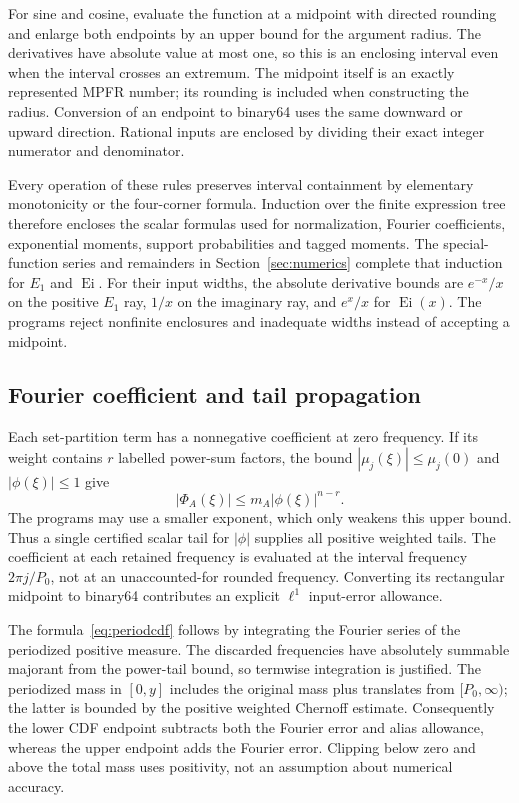 \documentclass[11pt,a4paper]{article}
\theoremstyle{definition}\newtheorem{definition}[theorem]{Definition}
\theoremstyle{remark}\newtheorem{remark}[theorem]{Remark}
\numberwithin{equation}{section}
\begin{document}
For sine and cosine, evaluate the function at a midpoint with directed rounding and enlarge both endpoints by an upper bound for the argument radius. The derivatives have absolute value at most one, so this is an enclosing interval even when the interval crosses an extremum. The midpoint itself is an exactly represented MPFR number; its rounding is included when constructing the radius. Conversion of an endpoint to binary64 uses the same downward or upward direction. Rational inputs are enclosed by dividing their exact integer numerator and denominator.

Every operation of these rules preserves interval containment by elementary monotonicity or the four-corner formula. Induction over the finite expression tree therefore encloses the scalar formulas used for normalization, Fourier coefficients, exponential moments, support probabilities and tagged moments. The special-function series and remainders in Section~\ref{sec:numerics} complete that induction for $E_1$ and $\operatorname{Ei}$. For their input widths, the absolute derivative bounds are $e^{-x}/x$ on the positive $E_1$ ray, $1/x$ on the imaginary ray, and $e^x/x$ for $\operatorname{Ei}(x)$. The programs reject nonfinite enclosures and inadequate widths instead of accepting a midpoint.

\subsection{Fourier coefficient and tail propagation}
Each set-partition term has a nonnegative coefficient at zero frequency. If its weight contains $r$ labelled power-sum factors, the bound $|\mu_j(\xi)|\le\mu_j(0)$ and $|\phi(\xi)|\le1$ give
\[
 |\Phi_A(\xi)|\le m_A|\phi(\xi)|^{n-r}.
\]
The programs may use a smaller exponent, which only weakens this upper bound. Thus a single certified scalar tail for $|\phi|$ supplies all positive weighted tails. The coefficient at each retained frequency is evaluated at the interval frequency $2\pi j/P_0$, not at an unaccounted-for rounded frequency. Converting its rectangular midpoint to binary64 contributes an explicit $\ell^1$ input-error allowance.

The formula~\eqref{eq:periodcdf} follows by integrating the Fourier series of the periodized positive measure. The discarded frequencies have absolutely summable majorant from the power-tail bound, so termwise integration is justified. The periodized mass in $[0,y]$ includes the original mass plus translates from $[P_0,\infty)$; the latter is bounded by the positive weighted Chernoff estimate. Consequently the lower CDF endpoint subtracts both the Fourier error and alias allowance, whereas the upper endpoint adds the Fourier error. Clipping below zero and above the total mass uses positivity, not an assumption about numerical accuracy.
\end{document}
